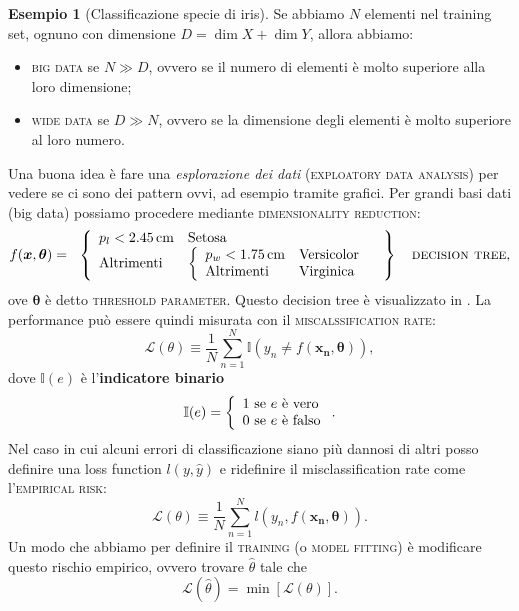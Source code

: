 \documentclass[10pt]{article}
\renewcommand{\vec}[1]{\boldsymbol{#1}}
\newcommand{\im}[1]{\textsc{#1}}
\theoremstyle{definition}
\newtheorem{example}{Esempio}[section]
\begin{document}
\begin{example}[Classificazione specie di iris]
Se abbiamo $N$ elementi nel training set, ognuno con dimensione $D = \dim{X} + \dim{Y}$, allora abbiamo:
\begin{itemize}
\item \im{big data} se $N\gg D$, ovvero se il numero di elementi è molto superiore alla loro dimensione;
\item \im{wide data} se $D\gg N$, ovvero se la dimensione degli elementi è molto superiore al loro numero.
\end{itemize}

Una buona idea è fare una \textit{esplorazione dei dati} (\im{exploatory data analysis}) per vedere se ci sono dei pattern ovvi, ad esempio tramite grafici. Per grandi basi dati (big data) possiamo procedere mediante \im{dimensionality reduction}:
\begin{equation}
f(\vec{x}, \vec{\theta}) = \left.\begin{array}{l}
\left\{\begin{array}{ll}
p_l < \qty{2.45}{cm} & \text{Setosa} \\
\text{Altrimenti} & \left\{\begin{array}{ll}
p_w < \qty{1.75}{cm} & \text{Versicolor} \\
\text{Altrimenti} & \text{Virginica} \\
\end{array}\right.
\end{array}\right.
\end{array}\right\} \quad\text{\im{decision tree}},
\end{equation}
ove $\vec{\theta}$ è detto \im{threshold parameter}. Questo decision tree è visualizzato in . La performance può essere quindi misurata con il \im{miscalssification rate}:
\begin{equation}\label{eq:misclassification-rate-simple}
\mathcal{L}(\theta) \equiv \frac{1}{N}\sum_{n=1}^N \mathbb{I}\left( y_n \neq f(\vec{x_n}, \vec{\theta}) \right),
\end{equation}
dove $\mathbb{I}(e)$ è l'\textbf{indicatore binario}
\begin{equation}
\mathbb{I}(e) = \left\{\begin{array}{l@{\text{ se } e \text{ è }}l}
1 & \text{vero} \\
0 & \text{falso} \\
\end{array}\right..
\end{equation}
Nel caso in cui alcuni errori di classificazione siano più dannosi di altri posso definire una loss function $l(y, \hat{y})$ e ridefinire il misclassification rate come l'\im{empirical risk}:
\begin{equation}\label{eq:misclassification-rate}
\mathcal{L}(\theta) \equiv \frac{1}{N}\sum_{n=1}^N l\left( y_n, f(\vec{x_n}, \vec{\theta}) \right).
\end{equation}
Un modo che abbiamo per definire il \im{training} (o \im{model fitting}) è modificare questo rischio empirico, ovvero trovare $\hat{\theta}$ tale che
\begin{equation}
\mathcal{L}(\hat{\theta}) = \min[\mathcal{L}(\theta)].
\end{equation}


\end{example}
\end{document}
